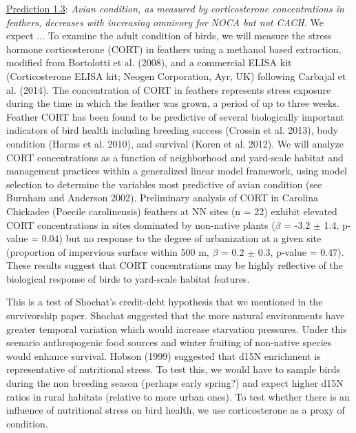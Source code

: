 \documentclass[12pt]{article}
\begin{document}

\noindent \underline{Prediction 1.3}: \textit{Avian condition, as measured by corticosterone concentrations in feathers, decreases with increasing omnivory for NOCA but not CACH.} We expect ... To examine the adult condition of birds, we will measure the stress hormone corticosterone (CORT) in feathers using a methanol based extraction, modified from Bortolotti et al. (2008), and a commercial ELISA kit (Corticosterone ELISA kit; Neogen Corporation, Ayr, UK) following Carbajal et al. (2014). The concentration of CORT in feathers represents stress exposure during the time in which the feather was grown, a period of up to three weeks. Feather CORT has been found to be predictive of several biologically important indicators of bird health including breeding success (Crossin et al. 2013), body condition (Harms et al. 2010), and survival (Koren et al. 2012). We will analyze CORT concentrations as a function of neighborhood and yard-scale habitat and management practices within a generalized linear model framework, using model selection to determine the variables most predictive of avian condition (see Burnham and Anderson 2002). Preliminary analysis of CORT in Carolina Chickadee (Poecile carolinensis) feathers at NN sites (n = 22) exhibit elevated CORT concentrations in sites dominated by non-native plants ($\beta$ = -3.2 $\pm$ 1.4, p-value = 0.04) but no response to the degree of urbanization at a given site (proportion of impervious surface within 500 m, $\beta$ = 0.2 $\pm$ 0.3, p-value = 0.47). These results suggest that CORT concentrations may be highly reflective of the biological response of birds to yard-scale habitat features.\par


 This is a test of Shochat’s credit-debt hypothesis that we mentioned in the survivorship paper. Shochat suggested that the more natural environments have greater temporal variation which would increase starvation pressures. Under this scenario anthropogenic food sources and winter fruiting of non-native species would enhance survival. Hobson (1999) suggested that d15N enrichment is representative of nutritional stress. To test this, we would have to sample birds during the non breeding season (perhaps early spring?) and expect higher d15N ratios in rural habitats (relative to more urban ones). To test whether there is an influence of nutritional stress on bird health, we use corticosterone as a proxy of condition. \par
\end{document}
